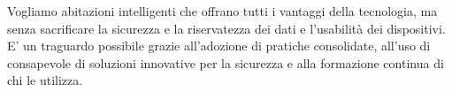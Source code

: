Vogliamo abitazioni intelligenti che offrano tutti i vantaggi della tecnologia, ma senza sacrificare la sicurezza e la riservatezza dei dati e l'usabilità dei dispositivi. E' un traguardo possibile grazie all'adozione di pratiche consolidate, all’uso di consapevole di soluzioni innovative per la sicurezza e alla formazione continua di chi le utilizza.